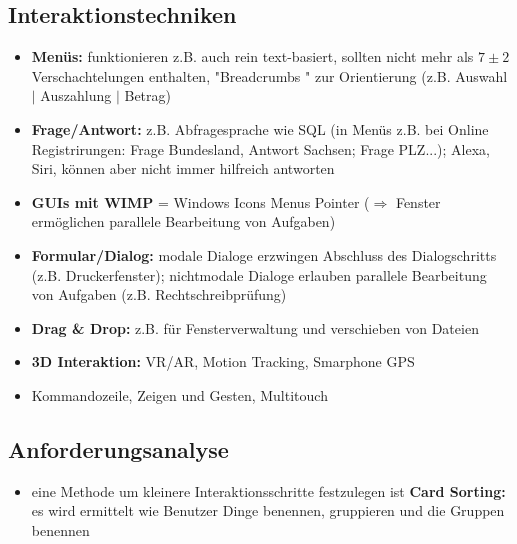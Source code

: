 \documentclass[12pt,landscape]{article}
\begin{document}
\begin{multicols}{3}
\subsection{Interaktionstechniken}
\begin{itemize}
\item \textbf{Menüs:} funktionieren z.B. auch rein text-basiert, sollten nicht mehr als $7\pm 2$ Verschachtelungen enthalten, "Breadcrumbs " zur Orientierung (z.B. Auswahl $\mid$ Auszahlung $\mid$ Betrag) 
\item \textbf{Frage/Antwort:} z.B. Abfragesprache wie SQL (in Menüs z.B. bei Online Registrirungen: Frage Bundesland, Antwort Sachsen; Frage PLZ...); Alexa, Siri, können aber nicht immer hilfreich antworten
\item \textbf{GUIs mit WIMP} = Windows Icons Menus Pointer ($\Rightarrow$ Fenster ermöglichen parallele Bearbeitung von Aufgaben)
\item \textbf{Formular/Dialog:} modale Dialoge erzwingen Abschluss des Dialogschritts (z.B. Druckerfenster); nichtmodale Dialoge erlauben parallele Bearbeitung von Aufgaben (z.B. Rechtschreibprüfung)
\item \textbf{Drag \& Drop:} z.B. für Fensterverwaltung und verschieben von Dateien
\item \textbf{3D Interaktion:} VR/AR, Motion Tracking, Smarphone GPS
\item Kommandozeile, Zeigen und Gesten, Multitouch 
\end{itemize}
\subsection{Anforderungsanalyse}
\begin{itemize}
\item eine Methode um kleinere Interaktionsschritte festzulegen ist \textbf{Card Sorting:} es wird ermittelt wie Benutzer Dinge benennen, gruppieren und die Gruppen benennen \\\\\\\\\\\\\\\\\\\\\\


\end{itemize}
\end{multicols}
\end{document}
